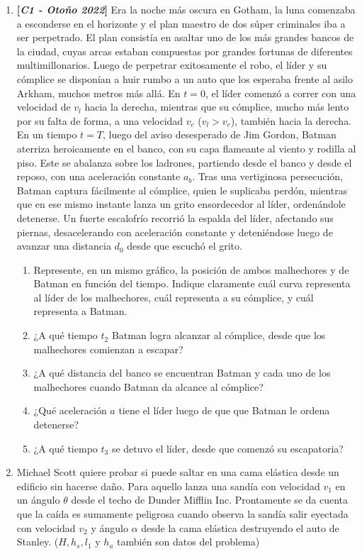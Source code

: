 \documentclass[letterpaper,11pt]{article}
\begin{document}
\begin{enumerate}
\item  \textbf{[\textit{C1 - Otoño 2022}]} Era la noche más oscura en Gotham, la luna comenzaba a esconderse en el horizonte
y el plan maestro de dos súper criminales iba a ser perpetrado. El plan consistía en asaltar
uno de los más grandes bancos de la ciudad, cuyas arcas estaban compuestas por grandes
fortunas de diferentes multimillonarios. Luego de perpetrar exitosamente el robo, el líder y
su cómplice se disponían a huir rumbo a un auto que los esperaba frente al asilo Arkham,
muchos metros más allá. En $t = 0$, el líder comenzó a correr con una velocidad de $v_l$ hacia la
derecha, mientras que su cómplice, mucho más lento por su falta de forma, a una velocidad
$v_c$ ($v_l > v_c$), también hacia la derecha. En un tiempo $t = T$, luego del aviso desesperado
de Jim Gordon, Batman aterriza heroicamente en el banco, con su capa flameante al viento
y rodilla al piso. Este se abalanza sobre los ladrones, partiendo desde el banco y desde el
reposo, con una aceleración constante $a_b$. Tras una vertiginosa persecución, Batman captura
fácilmente al cómplice, quien le suplicaba perdón, mientras que en ese mismo instante lanza
un grito ensordecedor al líder, ordenándole detenerse. Un fuerte escalofrío recorrió la espalda
del líder, afectando sus piernas, desacelerando con aceleración constante y deteniéndose luego
de avanzar una distancia $d_0$ desde que escuchó el grito.


\begin{enumerate}
    \item Represente, en un mismo gráfico, la posición de ambos malhechores y de Batman en
función del tiempo. Indique claramente cuál curva representa al líder de los malhechores,
cuál representa a su cómplice, y cuál representa a Batman.
    \item ¿A qué tiempo $t_2$ Batman logra alcanzar al cómplice, desde que los malhechores
comienzan a escapar?
    \item ¿A qué distancia del banco se encuentran Batman y cada uno de los malhechores
cuando Batman da alcance al cómplice?
    \item ¿Qué aceleración $a$ tiene el líder luego de que que Batman le ordena detenerse?
    \item ¿A qué tiempo $t_3$ se detuvo el líder, desde que comenzó su escapatoria?
\end{enumerate}

\item Michael Scott quiere probar si puede saltar en una cama elástica desde un edificio sin hacerse daño. Para aquello lanza una sandía con velocidad $v_1$ en un ángulo $\theta$ desde el techo de Dunder Mifflin Inc. Prontamente se da cuenta que la caída es sumamente peligrosa cuando observa la sandía salir eyectada con velocidad $v_2$ y ángulo $\alpha$ desde la cama elástica destruyendo el auto de Stanley. ($H,h_s,l_1$ y $h_a$ también son datos del problema)


\end{enumerate}
\end{document}

